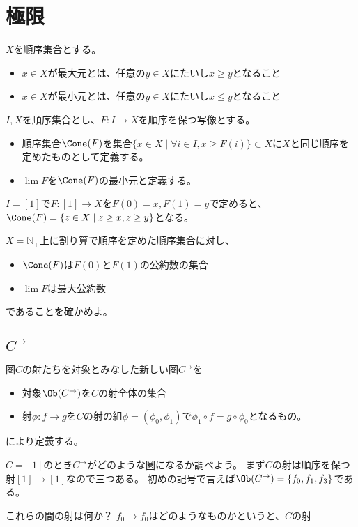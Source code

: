 \documentclass[uplatex]{jsarticle}
\begin{document}
\section{極限}
\begin{dfn}
$X$を順序集合とする。
\begin{itemize}
\item $x\in X$が最大元とは、任意の$y\in X$にたいし$x\geq y$となること
\item $x\in X$が最小元とは、任意の$y\in X$にたいし$x\leq y$となること
\end{itemize}

$I, X$を順序集合とし、$F:I\to X$を順序を保つ写像とする。
\begin{itemize}
\item 順序集合$\Cone(F)$を集合$\{x\in X\mid \forall i \in I, x\geq F(i)\}\subset X$に$X$と同じ順序を定めたものとして定義する。
\item $\lim F$を$\Cone(F)$の最小元と定義する。
\end{itemize}
\end{dfn}

$I=[1]$で$F:[1]\to X$を$F(0)=x, F(1)=y$で定めると、$\Cone(F)=\{z\in X\mid z\geq x, z\geq y\}$となる。
\begin{prob}
$X=\mathbb{N}_+$上に割り算で順序を定めた順序集合に対し、
\begin{itemize}
\item $\Cone(F)$は$F(0)$と$F(1)$の公約数の集合
\item $\lim F$は最大公約数
\end{itemize}
であることを確かめよ。
\end{prob}


\subsection{$C^\to$}
圏$C$の射たちを対象とみなした新しい圏$C^\to$を
\begin{itemize}
\item 対象$\Ob(C^\to)$を$C$の射全体の集合
\item 射$\phi\colon f\to g$を$C$の射の組$\phi=(\phi_0,\phi_1)$で$\phi_1\circ f=g\circ\phi_0$となるもの。
\end{itemize}
により定義する。

\begin{eg}
$C=[1]$のとき$C^\to$がどのような圏になるか調べよう。
まず$C$の射は順序を保つ射$[1]\to[1]$なので三つある。
初めの記号で言えば$\Ob(C^\to)=\{f_0, f_1, f_3\}$である。

これらの間の射は何か？
$f_0\to f_0$はどのようなものかというと、$C$の射
\end{eg}
\end{document}
